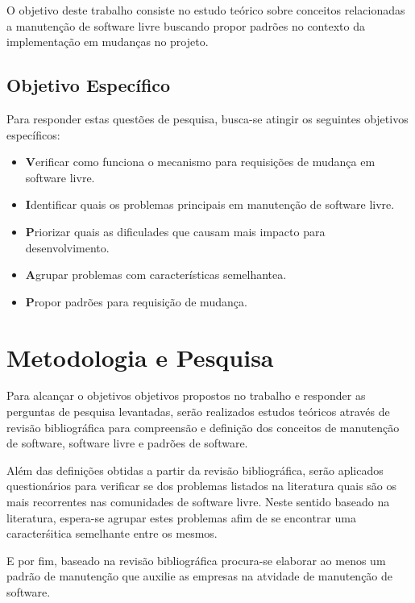 O objetivo deste trabalho consiste no estudo teórico sobre conceitos relacionadas a manutenção de software livre buscando propor padrões no contexto da implementação em mudanças no projeto.

\subsection{Objetivo Específico}

Para responder estas questões de pesquisa, busca-se atingir os seguintes objetivos específicos:
\begin{itemize}
\item \textbf Verificar como funciona o mecanismo para requisições de mudança em software livre.
\item \textbf Identificar quais os problemas principais em manutenção de software livre.
\item \textbf Priorizar quais as dificulades que causam mais impacto para desenvolvimento.
\item \textbf Agrupar problemas com características semelhantea.
\item \textbf Propor padrões para requisição de mudança.
\end{itemize}



\section{Metodologia e Pesquisa}

%
Para alcançar o objetivos objetivos propostos no trabalho e responder as perguntas de pesquisa levantadas, serão realizados estudos teóricos através de revisão bibliográfica para compreensão e definição dos conceitos de manutenção de software, software livre e padrões de software.

Além das definições obtidas a partir da revisão bibliográfica, serão aplicados questionários para verificar se dos problemas listados na literatura quais são os mais recorrentes nas comunidades de software livre. Neste sentido baseado na literatura, espera-se agrupar estes problemas afim de se encontrar uma caracterśitica semelhante entre os mesmos.

E por fim, baseado na revisão bibliográfica procura-se elaborar ao menos um padrão de manutenção que auxilie as empresas na atvidade de manutenção de software.


